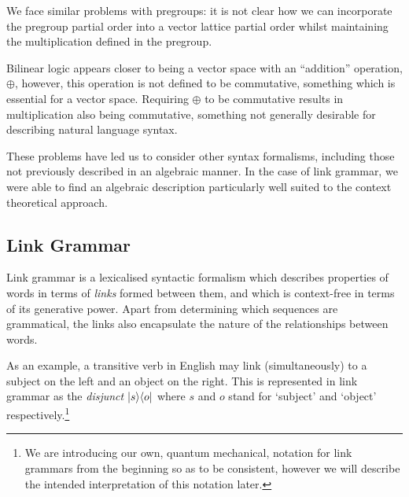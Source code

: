 \documentclass[12pt]{report}
\begin{document}
We face similar problems with pregroups: it is not clear how we can incorporate the pregroup partial order into a vector lattice partial order whilst maintaining the multiplication defined in the pregroup.

Bilinear logic appears closer to being a vector space with an ``addition'' operation, $\oplus$, however, this operation is not defined to be commutative, something which is essential for a vector space. Requiring $\oplus$ to be commutative results in multiplication also being commutative, something not generally desirable for describing natural language syntax.

These problems have led us to consider other syntax formalisms, including those not previously described in an algebraic manner. In the case of link grammar, we were able to find an algebraic description particularly well suited to the context theoretical approach.

\subsection{Link Grammar}

Link grammar \citep{Sleator:91} is a lexicalised syntactic formalism which describes properties of words in terms of \emph{links} formed between them, and which is context-free in terms of its generative power. Apart from determining which sequences are grammatical, the links also encapsulate the nature of the relationships between words.

As an example, a transitive verb in English may link (simultaneously) to a subject on the left and an object on the right. This is represented in link grammar as the \emph{disjunct} $|s \rangle\langle o|$ where $s$ and $o$ stand for `subject' and `object' respectively.\footnote{We are introducing our own, quantum mechanical, notation for link grammars from the beginning so as to be consistent, however we will describe the intended interpretation of this notation later.}
\end{document}
